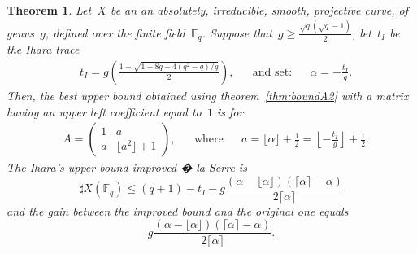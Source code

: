 \documentclass{amsart}
\newtheorem{theorem}[defin]{Theorem}
\newcommand{\F}{\mathbb{F}}
\begin{document}
\begin{theorem}\label{thm:main}
Let~$X$ be an an absolutely, irreducible, smooth, projective curve, of genus~$g$, defined over the finite field~$\F_q$.
Suppose that~$g \geq \frac{\sqrt{q}(\sqrt{q}-1)}{2}$, let~$t_I$ be the Ihara trace
\begin{align*}
&t_I = g\left(\frac{1-\sqrt{1+8q+4(q^2-q)/g}}{2}\right),
&
&\text{and set:}
&
&\alpha = - \frac{t_I}{g}.
\end{align*}
Then, the best upper bound obtained using theorem~\ref{thm:boundA2} with a matrix having an upper left coefficient equal to~$1$ is
for
\begin{align*}
&A =
\begin{pmatrix}
1 & a \\ a & \lfloor a^2 \rfloor + 1
\end{pmatrix},
&
&\text{where}
&
&a = \lfloor \alpha \rfloor +  \frac{1}{2} = \left\lfloor - \frac{t_I}{g} \right\rfloor +  \frac{1}{2}.
\end{align*}
The Ihara's upper bound improved {\it � la Serre} is
$$
\sharp X(\F_q)
\leq (q+1) - t_I - g\frac{(\alpha - \lfloor \alpha \rfloor)(\lceil \alpha \rceil -\alpha)}{2\lceil \alpha \rceil}
$$
and the gain between the improved bound and the original one equals
\begin{equation}\label{eq:diffmain}
g\frac{(\alpha - \lfloor \alpha \rfloor)(\lceil \alpha \rceil -\alpha)}{2\lceil \alpha \rceil}.
\end{equation}
\end{theorem}
\end{document}
